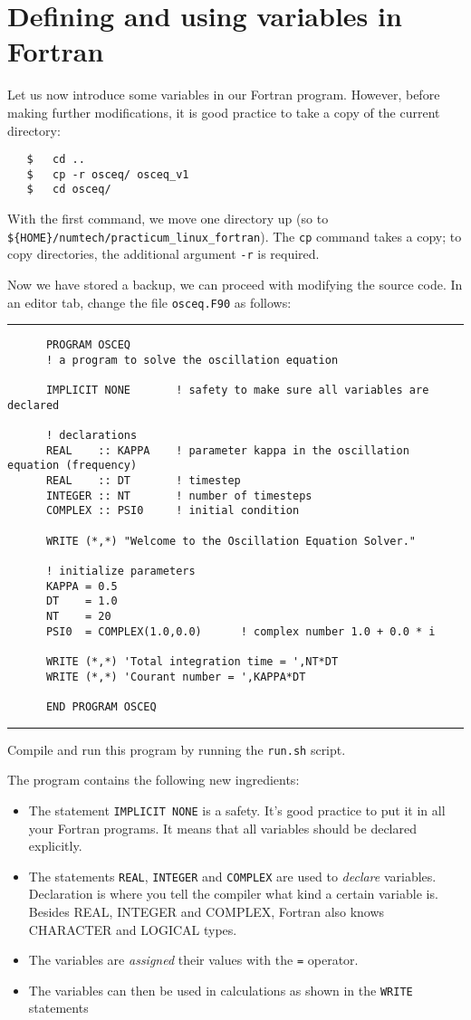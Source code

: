 \documentclass[a4paper]{article}
\begin{document}
\section{Defining and using variables in Fortran}
%
\par
Let us now introduce some variables in our Fortran program. However, before making further modifications, it is good practice to take a copy of the current directory:
%
\begin{verbatim}
   $   cd ..
   $   cp -r osceq/ osceq_v1
   $   cd osceq/
\end{verbatim}
%
With the first command, we move one directory up (so to \verb+${HOME}/numtech/practicum_linux_fortran+). The \verb+cp+ command takes a copy; to copy directories, the additional argument \verb+-r+ is required.
%
\par
Now we have stored a backup, we can proceed with modifying the source code. In an editor tab, change the file \texttt{osceq.F90} as follows:
%
{\vspace{10pt}\hrule\small\vspace*{-2pt}\begin{verbatim}
	  PROGRAM OSCEQ
	  ! a program to solve the oscillation equation
	  
	  IMPLICIT NONE       ! safety to make sure all variables are declared
	  
	  ! declarations
	  REAL    :: KAPPA    ! parameter kappa in the oscillation equation (frequency)
	  REAL    :: DT       ! timestep
	  INTEGER :: NT       ! number of timesteps
	  COMPLEX :: PSI0     ! initial condition

	  WRITE (*,*) "Welcome to the Oscillation Equation Solver."
	  
	  ! initialize parameters
	  KAPPA = 0.5
	  DT    = 1.0
	  NT    = 20
	  PSI0  = COMPLEX(1.0,0.0)      ! complex number 1.0 + 0.0 * i
	  
	  WRITE (*,*) 'Total integration time = ',NT*DT
	  WRITE (*,*) 'Courant number = ',KAPPA*DT
	  
	  END PROGRAM OSCEQ
\end{verbatim}\hrule\vspace{5pt}}
%
Compile and run this program by running the \verb+run.sh+ script.
%
\par
The program contains the following new ingredients:
%
\begin{itemize}
	\item The statement \verb+IMPLICIT NONE+ is a safety. It's good practice to put it in all your Fortran programs. It means that all variables should be declared explicitly.
	\item The statements \verb+REAL+, \verb+INTEGER+ and \verb+COMPLEX+ are used to \emph{declare} variables. Declaration is where you tell the compiler what kind a certain variable is. Besides REAL, INTEGER and COMPLEX, Fortran also knows CHARACTER and LOGICAL types.
	\item The variables are \emph{assigned} their values with the \verb+=+ operator.
	\item The variables can then be used in calculations as shown in the \verb+WRITE+ statements
\end{itemize}
\end{document}

